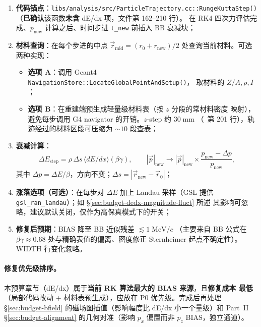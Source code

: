 \begin{enumerate}
  \item \textbf{代码锚点}：\texttt{libs/analysis/src/ParticleTrajectory.cc::RungeKuttaStep()}
        （\textbf{已确认}该函数\textbf{未含} dE/dx 项，文件第 162--210 行）。
        在 RK4 四次力评估完成、$p_\mathrm{new}$ 计算之后、时间步进 \texttt{t\_new}
        前插入 BB 衰减块；
  \item \textbf{材料查询}：在每个步进的中点 $\vec r_\mathrm{mid} = (r_0 + r_\mathrm{new})/2$
        处查询当前材料。可选两种实现：
        \begin{itemize}
          \item \textbf{选项 A}：调用 Geant4 \texttt{NavigationStore::LocateGlobalPointAndSetup()}，
                取材料的 $Z/A, \rho, I$；
          \item \textbf{选项 B}：在重建端预生成轻量级材料表（按 $z$ 分段的常材料密度
                映射），避免每步调用 G4 navigator 的开销。$z$-step 约 $30\;\mathrm{mm}$
                （\StatusReport{}~第 201 行），轨迹经过的材料区段可压缩为
                $\sim 10$ 段查表；
        \end{itemize}
  \item \textbf{衰减计算}：
        \begin{equation}
          \Delta E_\mathrm{step} = \rho \,\Delta s\,\langle dE/dx\rangle(\beta\gamma),
          \qquad |\vec p|_\mathrm{new} \to |\vec p|_\mathrm{new}\times \frac{p_\mathrm{new} - \Delta p}{p_\mathrm{new}},
        \end{equation}
        其中 $\Delta p = \Delta E/\beta$，方向不变；$\Delta s = |\vec r_\mathrm{new} - \vec r_0|$；
  \item \textbf{涨落选项（可选）}：在每步对 $\Delta E$ 加上 Landau 采样（GSL 提供
        \texttt{gsl\_ran\_landau}）；如 §\ref{sec:budget-dedx-magnitude-fluct} 所述
        其影响可忽略，建议默认关闭，仅作为高保真模式下的开关；
  \item \textbf{修复后预期}：BIAS 降至 BB 近似残差 $\lesssim 1\;\mathrm{MeV}/c$
        （主要来自 BB 公式在 $\beta\gamma \approx 0.68$ 处与精确表值的偏离、密度修正
        Sternheimer 起点不确定性）。WIDTH 行变化忽略。
\end{enumerate}


\paragraph{修复优先级排序。}
本预算章节（dE/dx）属于\textbf{当前 RK 算法最大的 BIAS 来源}，且\textbf{修复成本
最低}（局部代码改动 + 材料表预生成），应放在 P0 优先级。完成后再处理 §\ref{sec:budget-bfield}
的磁场图插值（影响幅度比 dE/dx 小一个量级）和 Part~II §\ref{sec:budget-alignment}
的几何对准（影响 $p_x$ 偏置而非 $p_z$ BIAS，独立通道）。

